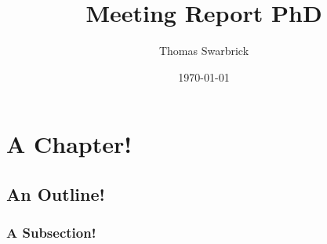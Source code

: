 \documentclass{report}
\title{Meeting Report PhD}
\author{Thomas Swarbrick}
\date{\today}
\begin{document}
\maketitle
\abstract
\tableofcontents
\newpage
\chapter{A Chapter!}
\section{An Outline!}

\subsection{A Subsection!}
\end{document}

